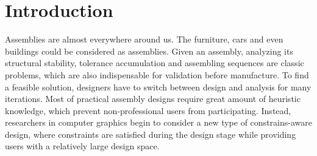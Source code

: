 

\section{Introduction}
\label{sec:introduction}

Assemblies are almost everywhere around us. The furniture, cars and even buildings could be considered as assemblies. Given an assembly, analyzing its structural stability, tolerance accumulation and assembling sequences are classic problems, which are also indispensable for validation before manufacture. To find a feasible solution, designers have to switch between design and analysis for many iterations. Most of practical assembly designs require great amount of heuristic knowledge, which prevent non-professional users from participating. Instead, researchers in computer graphics begin to consider a new type of constrains-aware design, where constraints are satisfied during the design stage while providing users with a relatively large design space.






